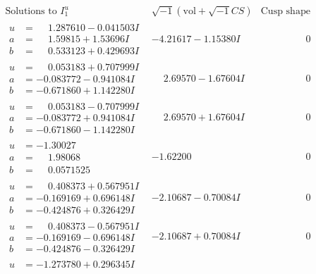 \documentclass[1p]{elsarticle_modified}
\theoremstyle{definition}
\newcommand{\I}{\sqrt{-1}}
\begin{document}
$$\begin{array}{c|c|c}
\text{Solutions to }I^u_{1}& \I (\text{vol} + \sqrt{-1}CS) & \text{Cusp shape}\\
 \hline 
\begin{aligned}
u &= \phantom{-}1.287610 - 0.041503 I \\
a &= \phantom{-}1.59815 + 1.53696 I \\
b &= \phantom{-}0.533123 + 0.429693 I\end{aligned}
 & -4.21617 - 1.15380 I & \phantom{-0.000000 } 0 \\ \hline\begin{aligned}
u &= \phantom{-}0.053183 + 0.707999 I \\
a &= -0.083772 - 0.941084 I \\
b &= -0.671860 + 1.142280 I\end{aligned}
 & \phantom{-}2.69570 - 1.67604 I & \phantom{-0.000000 } 0 \\ \hline\begin{aligned}
u &= \phantom{-}0.053183 - 0.707999 I \\
a &= -0.083772 + 0.941084 I \\
b &= -0.671860 - 1.142280 I\end{aligned}
 & \phantom{-}2.69570 + 1.67604 I & \phantom{-0.000000 } 0 \\ \hline\begin{aligned}
u &= -1.30027\phantom{ +0.000000I} \\
a &= \phantom{-}1.98068\phantom{ +0.000000I} \\
b &= \phantom{-}0.0571525\phantom{ +0.000000I}\end{aligned}
 & -1.62200\phantom{ +0.000000I} & \phantom{-0.000000 } 0 \\ \hline\begin{aligned}
u &= \phantom{-}0.408373 + 0.567951 I \\
a &= -0.169169 + 0.696148 I \\
b &= -0.424876 + 0.326429 I\end{aligned}
 & -2.10687 - 0.70084 I & \phantom{-0.000000 } 0 \\ \hline\begin{aligned}
u &= \phantom{-}0.408373 - 0.567951 I \\
a &= -0.169169 - 0.696148 I \\
b &= -0.424876 - 0.326429 I\end{aligned}
 & -2.10687 + 0.70084 I & \phantom{-0.000000 } 0 \\ \hline\begin{aligned}
u &= -1.273780 + 0.296345 I \\

\end{aligned}
\end{array}$$
\end{document}
